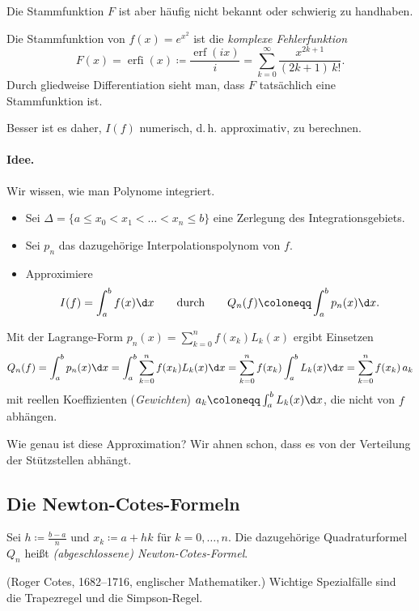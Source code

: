 \documentclass[11pt]{article}
\begin{document}
Die Stammfunktion $F$ ist aber häufig nicht bekannt oder schwierig zu handhaben.

\begin{example}
  Die Stammfunktion von $f(x) = e^{x^2}$ ist die \textit{komplexe Fehlerfunktion}
  \[ F(x) = \operatorname{erfi}(x) \coloneqq \frac{\operatorname{erf}(ix)}{i} = \sum_{k=0}^{\infty} \frac{x^{2k+1}}{(2k+1)\, k!}. \]
  Durch gliedweise Differentiation sieht man, dass $F$ tatsächlich eine Stammfunktion ist.
\end{example}


Besser ist es daher, $I(f)$ numerisch, d.\,h. approximativ, zu berechnen.

\paragraph{Idee.} Wir wissen, wie man Polynome integriert.
\begin{itemize}
  \item Sei $\Delta = \{a \le x_0 < x_1 < \dots < x_n \le b\}$ eine Zerlegung des Integrationsgebiets.
  \item Sei $p_n$ das dazugehörige Interpolationspolynom von $f$.
  \item Approximiere
    \[ I(f) = \int_a^b f(x) \d x \qquad \text{durch} \qquad Q_n(f) \coloneqq \int_a^b p_n(x) \d x. \]
\end{itemize}
Mit der Lagrange-Form $p_n(x) = \sum_{k=0}^{n} f(x_k) L_k(x)$ ergibt Einsetzen
\[
  Q_n(f) = \int_a^b p_n(x) \d x = \int_a^b \sum_{k=0}^{n} f(x_k) L_k(x) \d x = \sum_{k=0}^{n} f(x_k) \int_a^b L_k(x) \d x = \sum_{k=0}^{n} f(x_k)\, a_k
\]
mit reellen Koeffizienten (\emph{Gewichten}) $a_k \coloneqq \int_a^b L_k(x) \d x$, die nicht von $f$ abhängen.


Wie genau ist diese Approximation? Wir ahnen schon, dass es von der Verteilung der Stützstellen abhängt.

\subsection{Die Newton-Cotes-Formeln}

\begin{definition}\Theorem
  Sei $h \coloneqq \frac{b - a}{n}$ und $x_k \coloneqq a + hk$ für $k = 0, \dots, n$. Die dazugehörige Quadraturformel $Q_n$ heißt \emph{(abgeschlossene) Newton-Cotes-Formel}.
\end{definition}
(Roger Cotes, 1682--1716, englischer Mathematiker.) Wichtige Spezialfälle sind die Trapezregel und die Simpson-Regel.
\end{document}
